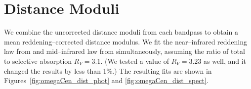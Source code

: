 \documentclass[a4paper,fleqn,usenatbib]{mnras}
\begin{document}

\section{Distance Moduli}
\label{sec:distance_moduli}

We combine the uncorrected distance moduli from each bandpass to obtain a mean reddening--corrected distance modulus. We fit the near--infrared reddening law from \citet{1989ApJ...345..245C} and mid--infrared law from \citet{2005ApJ...619..931I} simultaneously, assuming the ratio of total to selective absorption $R_V = 3.1$. (We tested a value of $R_V = 3.23$ as well, and it changed the results by less than 1\%.) The resulting fits are shown in Figures~\ref{fig:omegaCen_dist_phot} and \ref{fig:omegaCen_dist_spect}.

\end{document}
